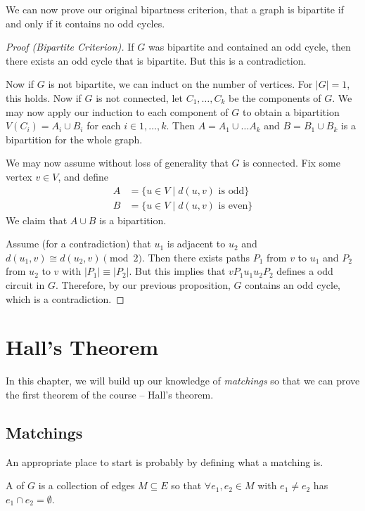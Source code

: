 \documentclass[a4paper]{scrreprt}
\begin{document}
We can now prove our original bipartness criterion, that a graph is bipartite if and only if it contains no odd cycles.

\begin{proof}[Proof (Bipartite Criterion)]
	If $G$ was bipartite and contained an odd cycle, then there exists an odd cycle that is bipartite. But this is a contradiction.

	Now if $G$ is not bipartite, we can induct on the number of vertices. For $|G| = 1$, this holds. Now if $G$ is not connected, let $C_1, \dots, C_k$ be the components of $G$. We may now apply our induction to each component of $G$ to obtain a bipartition $V(C_i) = A_i \cup B_i$ for each $i \in 1, \dots, k$. Then $A = A_1 \cup \dots A_k$ and $B = B_1 \cup B_k$ is a bipartition for the whole graph. 
	
	We may now assume without loss of generality that $G$ is connected. Fix some vertex $v \in V$, and define 
	\begin{align*}
		A &= \{u \in V \mid d(u, v) \text{ is odd} \} \\
		B &=  \{u \in V \mid d(u, v) \text{ is even} \}
	\end{align*}
	We claim that $A \cup B$ is a bipartition.

	Assume (for a contradiction) that $u_1$ is adjacent to $u_2$ and $d(u_1, v) \cong d(u_2, v) \pmod{2}$. Then there exists paths $P_1$ from $v$ to $u_1$ and $P_2$ from $u_2$ to $v$ with $|P_1| \equiv |P_2|$. But this implies that $vP_1u_1 u_2 P_2$ defines a odd circuit in $G$. Therefore, by our previous proposition, $G$ contains an odd cycle, which is a contradiction. 
\end{proof}

\chapter{Hall's Theorem}

In this chapter, we will build up our knowledge of \emph{matchings} so that we can prove the first theorem of the course -- Hall's theorem.

\section{Matchings}

An appropriate place to start is probably by defining what a matching is.

\begin{definition}[Matching]
	A  of $G$ is a collection of edges $M \subseteq E$ so that $\forall e_1, e_2 \in M$ with $e_1 \neq e_2$ has $e_1 \cap e_2 = \emptyset$.
\end{definition}
\end{document}

